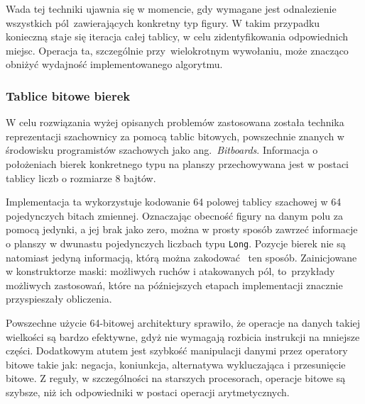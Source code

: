 Wada tej techniki ujawnia się w momencie, gdy wymagane jest odnalezienie wszystkich pól~zawierających konkretny typ figury.
W takim przypadku konieczną staje się iteracja całej tablicy, w celu zidentyfikowania odpowiednich miejsc.
Operacja ta, szczególnie przy~wielokrotnym wywołaniu, może znacząco obniżyć wydajność implementowanego algorytmu.

%
%
%
%


\subsubsection{Tablice bitowe bierek}

W celu rozwiązania wyżej opisanych problemów zastosowana została technika reprezentacji szachownicy za pomocą tablic bitowych, powszechnie znanych w środowisku programistów szachowych jako ang.~\emph{Bitboards}.
Informacja o położeniach bierek konkretnego typu na planszy przechowywana jest w postaci tablicy liczb o rozmiarze 8 bajtów.

Implementacja ta wykorzystuje kodowanie 64 polowej tablicy szachowej w 64 pojedynczych bitach zmiennej.
Oznaczając obecność figury na danym polu za pomocą jedynki, a jej brak jako zero, można w prosty sposób zawrzeć informacje o planszy w dwunastu pojedynczych liczbach typu \texttt{Long}.
Pozycje bierek nie są natomiast jedyną informacją, którą można zakodować ~ten sposób.
Zainicjowane w konstruktorze maski: możliwych ruchów i atakowanych pól, to~przykłady możliwych zastosowań, które na późniejszych etapach implementacji znacznie przyspieszały obliczenia.

Powszechne użycie 64-bitowej architektury sprawiło, że operacje na danych takiej wielkości są bardzo efektywne, gdyż nie wymagają rozbicia instrukcji na mniejsze części.
Dodatkowym atutem jest szybkość manipulacji danymi przez operatory bitowe takie jak: negacja, koniunkcja, alternatywa wykluczająca i przesunięcie bitowe.
Z reguły, w szczególności na starszych procesorach, operacje bitowe są szybsze, niż ich odpowiedniki w postaci operacji arytmetycznych.

%

